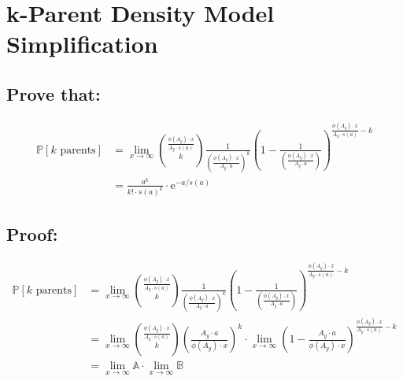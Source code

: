 \documentclass{article}
\theoremstyle{definition}
\begin{document}
\section{k-Parent Density Model Simplification}
\subsection*{Prove that:}
\begin{align*}
    \mathbb{P}[k \text{ parents}] & =  \lim_{x \to \infty}{\frac{\phi(A_y) \cdot x}{A_y \cdot s(a)} \choose k } \frac{1}{\left(\frac{\phi(A_y) \cdot x}{ A_y \cdot a}\right)^k} \left(1- \frac{1}{\left(\frac{\phi(A_y) \cdot x}{ A_y \cdot a}\right)}\right)^{\frac{\phi(A_y) \cdot x}{A_y \cdot s(a)  } -k} \\
                                  & = \frac{a^{k}}{k! \cdot s(a)^k} \cdot \text{e}^{-a/s(a)}
\end{align*}

\subsection*{Proof:} \begin{align*}
    \mathbb{P}[k \text{ parents}] & =  \lim_{x \to \infty}{\frac{\phi(A_y) \cdot x}{A_y \cdot s(a)} \choose k } \frac{1}{\left(\frac{\phi(A_y) \cdot x}{ A_y \cdot a}\right)^k} \left(1- \frac{1}{\left(\frac{\phi(A_y) \cdot x}{ A_y \cdot a}\right)}\right)^{\frac{\phi(A_y) \cdot x}{A_y \cdot s(a)  } -k} \\
                                  & =  \lim_{x \to \infty}{\frac{\phi(A_y) \cdot x}{A_y \cdot s(a)} \choose k } \left(\frac{A_y \cdot a}{\phi(A_y) \cdot x}\right)^k \cdot \lim_{x \to \infty}\left(1- \frac{A_y \cdot a}{\phi(A_y) \cdot x}\right)^{\frac{\phi(A_y) \cdot x}{A_y \cdot s(a)  } -k}           \\
                                  & =  \lim_{x \to \infty}\mathbb{A}  \cdot \lim_{x \to \infty} \mathbb{B}
\end{align*}
\end{document}
